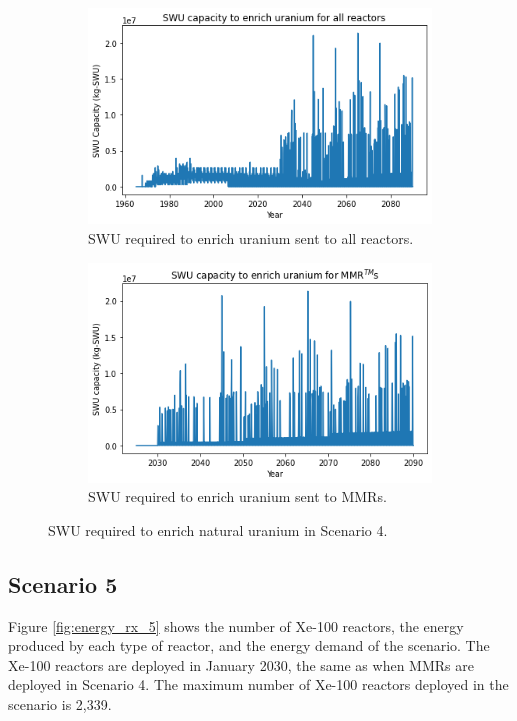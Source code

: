 \begin{figure}
    \centering
    \begin{subfigure}{0.5\textwidth}
        \centering
        \includegraphics[scale=0.5]{../figures/totalswu_scenarios_4.png}
        \caption{\gls{SWU} required to enrich uranium sent to all reactors.}
        \label{fig:totalswu_4}
    \end{subfigure}
    \hspace{0.8cm}
    \begin{subfigure}{0.5\textwidth}
        \centering
        \includegraphics[scale=0.5]{../figures/haleuSWU_scenarios_4.png}
        \caption{\gls{SWU} required to enrich uranium sent to \glspl{MMR}.}
        \label{fig:haleuswu_4}
    \end{subfigure}
    \caption{\gls{SWU} required to enrich natural uranium in Scenario 4.}
    \label{fig:swu_4}
\end{figure}


\subsection{Scenario 5}
Figure \ref{fig:energy_rx_5} shows the number of Xe-100 reactors, the 
energy produced by each type of reactor, and the energy demand of the 
scenario. The Xe-100 reactors are deployed in January 2030, the 
same as when 
\glspl{MMR} are deployed in Scenario 4. The maximum number of Xe-100 
reactors deployed in the scenario is 2,339. 

